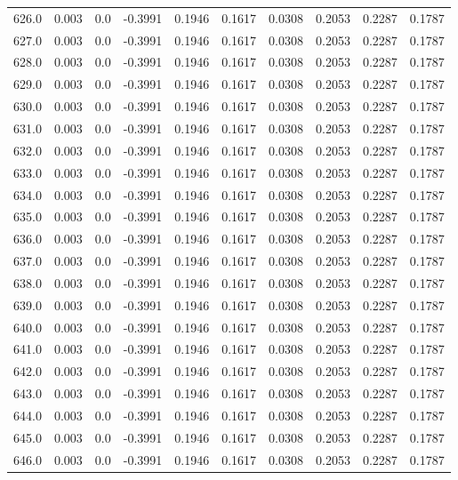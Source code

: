 \begin{longtable}{lrrrrrrrrr}
626.0 & 0.003 & 0.0 & -0.3991 & 0.1946 & 0.1617 & 0.0308 & 0.2053 & 0.2287 & 0.1787 \\
627.0 & 0.003 & 0.0 & -0.3991 & 0.1946 & 0.1617 & 0.0308 & 0.2053 & 0.2287 & 0.1787 \\
628.0 & 0.003 & 0.0 & -0.3991 & 0.1946 & 0.1617 & 0.0308 & 0.2053 & 0.2287 & 0.1787 \\
629.0 & 0.003 & 0.0 & -0.3991 & 0.1946 & 0.1617 & 0.0308 & 0.2053 & 0.2287 & 0.1787 \\
630.0 & 0.003 & 0.0 & -0.3991 & 0.1946 & 0.1617 & 0.0308 & 0.2053 & 0.2287 & 0.1787 \\
631.0 & 0.003 & 0.0 & -0.3991 & 0.1946 & 0.1617 & 0.0308 & 0.2053 & 0.2287 & 0.1787 \\
632.0 & 0.003 & 0.0 & -0.3991 & 0.1946 & 0.1617 & 0.0308 & 0.2053 & 0.2287 & 0.1787 \\
633.0 & 0.003 & 0.0 & -0.3991 & 0.1946 & 0.1617 & 0.0308 & 0.2053 & 0.2287 & 0.1787 \\
634.0 & 0.003 & 0.0 & -0.3991 & 0.1946 & 0.1617 & 0.0308 & 0.2053 & 0.2287 & 0.1787 \\
635.0 & 0.003 & 0.0 & -0.3991 & 0.1946 & 0.1617 & 0.0308 & 0.2053 & 0.2287 & 0.1787 \\
636.0 & 0.003 & 0.0 & -0.3991 & 0.1946 & 0.1617 & 0.0308 & 0.2053 & 0.2287 & 0.1787 \\
637.0 & 0.003 & 0.0 & -0.3991 & 0.1946 & 0.1617 & 0.0308 & 0.2053 & 0.2287 & 0.1787 \\
638.0 & 0.003 & 0.0 & -0.3991 & 0.1946 & 0.1617 & 0.0308 & 0.2053 & 0.2287 & 0.1787 \\
639.0 & 0.003 & 0.0 & -0.3991 & 0.1946 & 0.1617 & 0.0308 & 0.2053 & 0.2287 & 0.1787 \\
640.0 & 0.003 & 0.0 & -0.3991 & 0.1946 & 0.1617 & 0.0308 & 0.2053 & 0.2287 & 0.1787 \\
641.0 & 0.003 & 0.0 & -0.3991 & 0.1946 & 0.1617 & 0.0308 & 0.2053 & 0.2287 & 0.1787 \\
642.0 & 0.003 & 0.0 & -0.3991 & 0.1946 & 0.1617 & 0.0308 & 0.2053 & 0.2287 & 0.1787 \\
643.0 & 0.003 & 0.0 & -0.3991 & 0.1946 & 0.1617 & 0.0308 & 0.2053 & 0.2287 & 0.1787 \\
644.0 & 0.003 & 0.0 & -0.3991 & 0.1946 & 0.1617 & 0.0308 & 0.2053 & 0.2287 & 0.1787 \\
645.0 & 0.003 & 0.0 & -0.3991 & 0.1946 & 0.1617 & 0.0308 & 0.2053 & 0.2287 & 0.1787 \\
646.0 & 0.003 & 0.0 & -0.3991 & 0.1946 & 0.1617 & 0.0308 & 0.2053 & 0.2287 & 0.1787 \\

\end{longtable}
